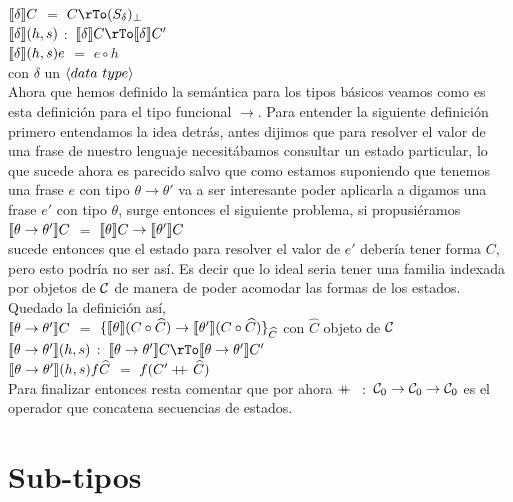 \noindent
$\llbracket  \delta  \rrbracket C$ $=$ $C \rTo (S_{\delta})_\bot$\\
$\llbracket  \delta  \rrbracket(h,s)$ $:$ $\semBrcks{ \delta }C \rTo \semBrcks{ \delta }C'$\\
$\llbracket  \delta  \rrbracket(h,s)e$ $=$ $e \circ h$ \\
con $\delta$ un $\langle data \ type \rangle$\\

Ahora que hemos definido la sem\'antica para los tipos b\'asicos
veamos como es esta definici\'on para el tipo funcional $\rightarrow$.
Para entender la siguiente definici\'on primero entendamos la idea 
detr\'as, antes dijimos que para resolver el valor de una frase
de nuestro lenguaje necesit\'abamos consultar un estado particular,
lo que sucede ahora es parecido salvo que como estamos suponiendo
que tenemos una frase $e$ con tipo $\theta \rightarrow \theta'$ va 
a ser interesante poder aplicarla a digamos una frase $e'$ con tipo
$\theta$, surge entonces el siguiente problema, si propusi\'eramos \\

\noindent
$\llbracket  \theta \rightarrow \theta'  \rrbracket C$ $=$ $ \llbracket  \theta  \rrbracket C \rightarrow  \llbracket  \theta'  \rrbracket C$\\

\noindent
sucede entonces que el estado para resolver el valor de $e'$ deber\'ia
tener forma $C$, pero esto podr\'ia no ser as\'i. Es decir que lo ideal
seria tener una familia indexada por objetos de $\mathcal{C}$ de manera de poder
acomodar las formas de los estados. Quedado la definici\'on as\'i,\\

\noindent
$\llbracket  \theta \rightarrow \theta'  \rrbracket C$ $=$ 
$\{ \llbracket  \theta  \rrbracket(C \circ \widehat{C}) \rightarrow  \llbracket  \theta'  \rrbracket(C \circ \widehat{C}) \}_{\widehat{C}}$ 
con $\widehat{C}$ objeto de $\mathcal{C}$\\
$\llbracket  \theta \rightarrow \theta'  \rrbracket(h,s)$ 
$:$ $\semBrcks{ \theta \rightarrow \theta' }C \rTo \semBrcks{ \theta \rightarrow \theta' }C'$\\
$\llbracket  \theta \rightarrow \theta'  \rrbracket(h,s)f\widehat{C}$ $=$ $f(C' +\kern-1.3ex+\kern0.8ex \widehat{C})$\\

Para finalizar entonces resta comentar que por ahora $+\kern-1.3ex+\kern0.8ex$ $:$ $\mathcal{C}_0 \rightarrow \mathcal{C}_0 \rightarrow \mathcal{C}_0$
es el operador que concatena secuencias de estados.

\section{Sub-tipos}

